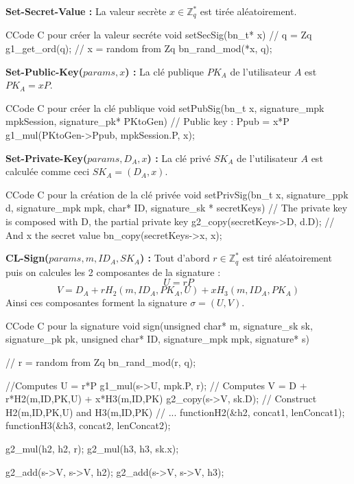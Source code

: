 \textbf{Set-Secret-Value :} La valeur secrète $x \in \mathbb{Z}_q^*$ est tirée aléatoirement.

\begin{sourcebox}{C}{Code C pour créer la valeur secréte}
	void setSecSig(bn_t* x){
		// q = Zq
		g1_get_ord(q);
		// x = random from Zq
		bn_rand_mod(*x, q);
	}
\end{sourcebox}

\textbf{Set-Public-Key($params, x$) :}  La clé publique $PK_A$ de l'utilisateur $A$ est $PK_A = xP$.

\begin{sourcebox}{C}{Code C pour créer la clé publique}
	void setPubSig(bn_t x, signature_mpk mpkSession, signature_pk* PKtoGen){
		// Public key : Ppub = x*P
		g1_mul(PKtoGen->Ppub, mpkSession.P, x);
	}
\end{sourcebox}

\textbf{Set-Private-Key($params, D_A, x$) :} La clé privé $SK_A$ de l'utilisateur $A$ est calculée comme ceci $SK_A = (D_A, x)$.

\begin{sourcebox}{C}{Code C pour la création de la clé privée}
	void setPrivSig(bn_t x, signature_ppk d, signature_mpk mpk, char* ID, signature_sk * secretKeys){
		// The private key is composed with D, the partial private key
		g2_copy(secretKeys->D, d.D);
		// And x the secret value
		bn_copy(secretKeys->x, x);
	}
\end{sourcebox}

\textbf{CL-Sign($params, m, ID_A, SK_A$) :} Tout d'abord $r \in \mathbb{Z}_q^*$ est tiré aléatoirement puis on calcules les 2 composantes de la signature :
\[ U = rP\]
\[V = D_A + rH_2(m, ID_A, PK_A,U) + xH_3(m, ID_A, PK_A)\]
Ainsi ces composantes forment la signature $\sigma = (U,V)$.

\begin{sourcebox}{C}{Code C pour la signature}
	void sign(unsigned char* m, signature_sk sk, signature_pk pk, unsigned char* ID, signature_mpk mpk, signature* s){
		// r = random from Zq
		bn_rand_mod(r, q);
		
		//Computes U = r*P
		g1_mul(s->U, mpk.P, r);
		// Computes V = D + r*H2(m,ID,PK,U) + x*H3(m,ID,PK)
		g2_copy(s->V, sk.D);
		// Construct H2(m,ID,PK,U) and H3(m,ID,PK)
		// ...
		functionH2(&h2, concat1, lenConcat1);
		functionH3(&h3, concat2, lenConcat2);
		
		g2_mul(h2, h2, r);
		g2_mul(h3, h3, sk.x);
		
		g2_add(s->V, s->V, h2);
		g2_add(s->V, s->V, h3);
	}
\end{sourcebox}

